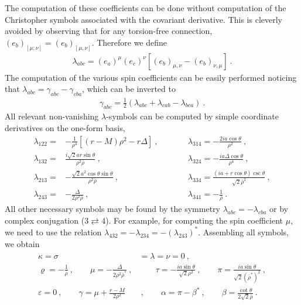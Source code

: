 The computation of these coefficients can be done without computation of the Christopher symbols associated with the covariant derivative.
This is cleverly avoided by observing that for any torsion-free connection, $(e_b)_{[\mu;\nu]} = (e_b)_{[\mu,\nu]}$.
Therefore we define
\begin{align}
    \lambda_{abc} = (e_a)^\mu (e_c)^\nu \left[ (e_b)_{\mu,\nu} - (e_b)_{\nu,\mu} \right]~.
\end{align}
The computation of the various spin coefficients can be easily performed noticing that $\lambda_{abc} = \gamma_{abc} - \gamma_{cba}$, which can be inverted to
\begin{align}
    \gamma_{abc} = \frac{1}{2} \left( \lambda_{abc} + \lambda_{cab} - \lambda_{bca} \right) ~.
\end{align}
All relevant non-vanishing $\lambda$-symbols can be computed by simple coordinate derivatives on the one-form basis,
\begin{equation}
    \begin{alignedat}{3}
        \lambda_{122} =& -\frac{1}{\rho^4} \left[ (r-M) \rho^2 - r \Delta \right] ~,\qquad && \lambda_{314} = - \frac{2 i a \cos\theta}{\rho^2} ~, \\
        \lambda_{132} =& \frac{i \sqrt{2} a r \sin\theta}{\rho^2 \bar{\rho}} ~,\qquad && \lambda_{324} = - \frac{i a \Delta \cos\theta}{\rho^4}~, \\
        \lambda_{213} =& -\frac{\sqrt{2} a^2 \cos\theta \sin\theta }{\rho^2 \bar{\rho}} ~,\qquad && \lambda_{334} = \frac{(i a + r \cos\theta ) \csc\theta }{\sqrt{2} \bar{\rho}^2} ~, \\
        \lambda_{243} =& -\frac{\Delta}{2 \rho^2 \bar{\rho}} ~,\qquad && \lambda_{341} = - \frac{1}{ \bar{\rho}} ~.
    \end{alignedat}
\end{equation}
All other necessary symbols may be found by the symmetry $\lambda_{abc}=-\lambda_{cba}$ or by complex conjugation ($3 \rightleftarrows 4$). For example, for computing the spin coefficient $\mu$, we need to use the relation $\lambda_{432}=-\lambda_{234}=-(\lambda_{243})^*$.
Assembling all symbols, we obtain
\begin{align}
    \begin{split}
        \kappa = \sigma &= \lambda = \nu = 0  ~, \\[0.15cm]
        \varrho = - \frac{1}{\bar{\rho}}  ~,\qquad \mu = - \frac{\Delta}{ 2 \rho^2 \bar{\rho}^*}  ~,&\qquad \tau = - \frac{i a \sin\theta}{\sqrt{2} \rho^2}  ~,\qquad \pi = \frac{i a \sin\theta}{\sqrt{2} (\bar{\rho}^*)^2}  ~, \\[0.15cm]
        \varepsilon = 0  ~,\qquad \gamma = \mu + \frac{r-M}{2 \rho^2}  &~,\qquad \alpha = \pi-\beta^* ~,\qquad \beta = \frac{\cot\theta}{2 \sqrt{2} \bar{\rho} }  ~.
    \end{split}
\end{align}


